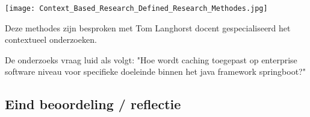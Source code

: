 \texttt{[image: Context\_Based\_Research\_Defined\_Research\_Methodes.jpg]}\label{fig:research_methodes}

Deze methodes zijn besproken met Tom Langhorst docent gespecialiseerd het contextueel onderzoeken.

De onderzoeks vraag luid als volgt: "Hoe wordt caching toegepast op enterprise software niveau voor specifieke doeleinde binnen het java framework springboot?"

\subsection{Eind beoordeling / reflectie}
\newpage
